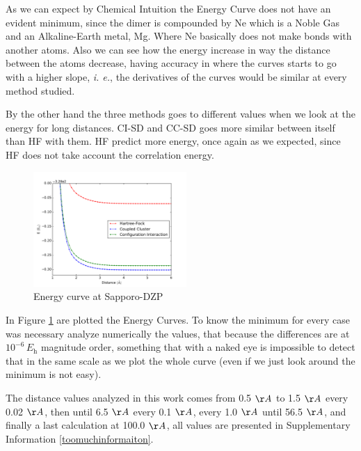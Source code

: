As we can expect by Chemical Intuition the Energy Curve does not have an
evident minimum, since the dimer is compounded by Ne which is a Noble Gas and an
Alkaline-Earth metal, Mg. Where Ne basically does not make bonds with another
atoms. Also we can see how the energy increase in way the distance between the
atoms decrease, having accuracy in where the curves starts to go with a higher
slope, \textit{i. e.}, the derivatives of the curves would be similar at every
method studied.

By the other hand the three methods goes to different values when we look at
the energy for long distances. CI-SD and CC-SD goes more similar between
itself than HF with them. HF predict more energy, once again as we expected,
since HF does not take account the correlation energy.

\begin{figure}%
\centering
\includegraphics[width=0.52\textwidth]{./img/plots/dzp}%
\caption{Energy curve at Sapporo-DZP}
\label{raw_curve}
\end{figure}

In Figure \ref{raw_curve} are plotted the Energy Curves. To know the minimum for
every case was necessary analyze numerically the values, that because the
differences are at $10^{-6} \, E\mathrm{_h}$ magnitude order, something that with a naked eye
is impossible to detect that in the same scale as we plot the whole curve (even if we just
look around the minimum is not easy).

The distance values analyzed in this work comes from 0.5 $\AA$ to 1.5 $\AA$ every
0.02 $\AA$, then until 6.5 $\AA$ every 0.1 $\AA$, every 1.0 $\AA$ until
56.5 $\AA$, and finally a last calculation at 100.0 $\AA$, all values are
presented in Supplementary Information \ref{toomuchinformaiton}.


